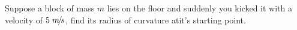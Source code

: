 \scalebox{2}{Q.}
Suppose a block of mass $m$ lies on the floor and suddenly you kicked it with a velocity of $5\ms$, find its radius of curvature atit's starting point.
